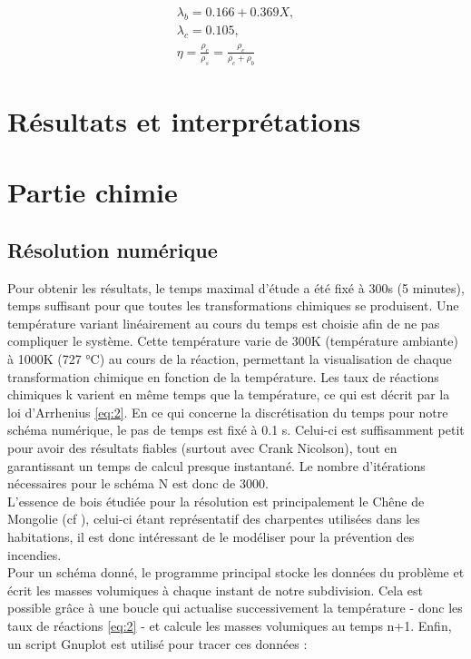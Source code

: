 \documentclass[a4paper,11pt]{article}
\begin{document}
\begin{equation}
    \begin{array}{l}
\lambda_{b}=0.166+0.369 X, \\
\lambda_{c}=0.105, \\
\eta = \frac{\rho_c}{\rho_s} = \frac{\rho_c}{\rho_c + \rho_b}
\end{array}
\end{equation}
\section*{Résultats et interprétations}\label{sec:ri}


\section{Partie chimie}
 
\subsection{Résolution numérique}

Pour obtenir les résultats, le temps maximal d'étude a été fixé à 300s (5 minutes), temps suffisant pour que toutes les transformations chimiques se produisent. Une température variant linéairement au cours du temps est choisie afin de ne pas compliquer le système. Cette température varie de 300K (température ambiante) à 1000K (727 °C) au cours de la réaction, permettant la visualisation de chaque transformation chimique en fonction de la température. Les taux de réactions chimiques k varient en même temps que la température, ce qui est décrit par la loi d'Arrhenius \eqref{eq:2}. En ce qui concerne la discrétisation du temps pour notre schéma numérique, le pas de temps est fixé à 0.1 s. Celui-ci est suffisamment petit pour avoir des résultats fiables (surtout avec Crank Nicolson), tout en garantissant un temps de calcul presque instantané. Le nombre d'itérations nécessaires pour le schéma N est donc de 3000. 
\\

L'essence de bois étudiée pour la résolution est principalement le Chêne de Mongolie (cf \cite{1}), celui-ci étant représentatif des charpentes utilisées dans les habitations, il est donc intéressant de le modéliser pour la prévention des incendies. \\

Pour un schéma donné, le programme principal stocke les données du problème et écrit les masses volumiques à chaque instant de notre subdivision. Cela est possible grâce à une boucle qui actualise successivement la température - donc les taux de réactions \eqref{eq:2} - et calcule les masses volumiques au temps n+1. Enfin, un script Gnuplot est utilisé pour tracer ces données :
\end{document}

